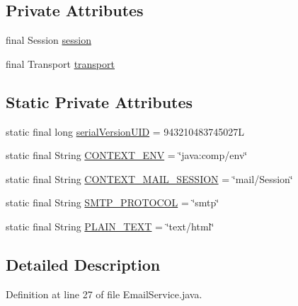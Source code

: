 \subsection*{Private Attributes}
\begin{DoxyCompactItemize}
\item 
final Session \hyperlink{classbr_1_1usp_1_1cata_1_1service_1_1_email_service_aaff5f980e96cf78a79aabe980bb9b11f}{session}
\item 
final Transport \hyperlink{classbr_1_1usp_1_1cata_1_1service_1_1_email_service_a57a5b449146d14f21719964cea77a272}{transport}
\end{DoxyCompactItemize}
\subsection*{Static Private Attributes}
\begin{DoxyCompactItemize}
\item 
static final long \hyperlink{classbr_1_1usp_1_1cata_1_1service_1_1_email_service_ac3ac333b655045e9597db2ba8a7cb86a}{serial\+Version\+U\+I\+D} = 943210483745027\+L
\item 
static final String \hyperlink{classbr_1_1usp_1_1cata_1_1service_1_1_email_service_a61e23d47de11117d2537c6cba837a517}{C\+O\+N\+T\+E\+X\+T\+\_\+\+E\+N\+V} = \char`\"{}java\+:comp/env\char`\"{}
\item 
static final String \hyperlink{classbr_1_1usp_1_1cata_1_1service_1_1_email_service_a5aa5219ae5563c584505f2640cb10aae}{C\+O\+N\+T\+E\+X\+T\+\_\+\+M\+A\+I\+L\+\_\+\+S\+E\+S\+S\+I\+O\+N} = \char`\"{}mail/Session\char`\"{}
\item 
static final String \hyperlink{classbr_1_1usp_1_1cata_1_1service_1_1_email_service_a0ba51bf199752796ea41d35d70426a03}{S\+M\+T\+P\+\_\+\+P\+R\+O\+T\+O\+C\+O\+L} = \char`\"{}smtp\char`\"{}
\item 
static final String \hyperlink{classbr_1_1usp_1_1cata_1_1service_1_1_email_service_a2f0e25106fa65e8a6158924ca52204b5}{P\+L\+A\+I\+N\+\_\+\+T\+E\+X\+T} = \char`\"{}text/html\char`\"{}
\end{DoxyCompactItemize}


\subsection{Detailed Description}


Definition at line 27 of file Email\+Service.\+java.



